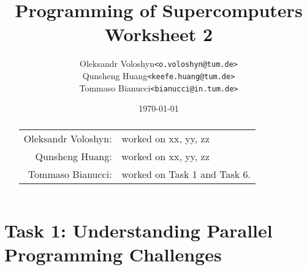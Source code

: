 \documentclass{article}
\title{Programming of Supercomputers\\Worksheet 2}
\author{
	\begin{tabular}{rl}
		Oleksandr Voloshyn& \texttt{<o.voloshyn@tum.de>}\\ 
		Qunsheng Huang& \texttt{<keefe.huang@tum.de>}\\ 
		Tommaso Bianucci& \texttt{<bianucci@in.tum.de>}
	\end{tabular}
}
\date{\today}
\begin{document}
\maketitle
\renewcommand{\abstractname}{Group members's contributions}
\begin{abstract}
	\begin{center}
		\begin{tabular}{rl}
		Oleksandr Voloshyn:& worked on xx, yy, zz\\
		Qunsheng Huang:& worked on xx, yy, zz\\
		Tommaso Bianucci:& worked on Task 1 and Task 6.
		\end{tabular}
	\end{center}
\end{abstract}

\section{Task 1: Understanding Parallel Programming Challenges}
\end{document}
